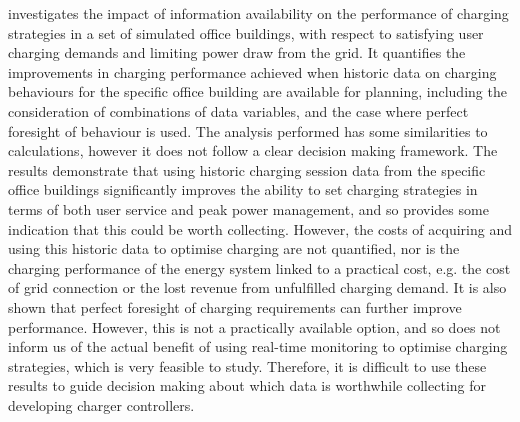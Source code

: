  investigates the impact of information availability on the performance of  charging strategies in a set of simulated office buildings, with respect to satisfying user charging demands and limiting power draw from the grid. It quantifies the improvements in charging performance achieved when historic data on  charging behaviours for the specific office building are available for planning, including the consideration of combinations of data variables, and the case where perfect foresight of  behaviour is used. The analysis performed has some similarities to  calculations, however it does not follow a clear decision making framework. The results demonstrate that using historic  charging session data from the specific office buildings significantly improves the ability to set  charging strategies in terms of both user service and peak power management, and so provides some indication that this could be worth collecting. However, the costs of acquiring and using this historic data to optimise charging are not quantified, nor is the charging performance of the energy system linked to a practical cost, e.g. the cost of grid connection or the lost revenue from unfulfilled charging demand. It is also shown that perfect foresight of  charging requirements can further improve performance. However, this is not a practically available option, and so does not inform us of the actual benefit of using real-time monitoring to optimise charging strategies, which is very feasible to study. Therefore, it is difficult to use these results to guide decision making about which data is worthwhile collecting for developing  charger controllers.\\

